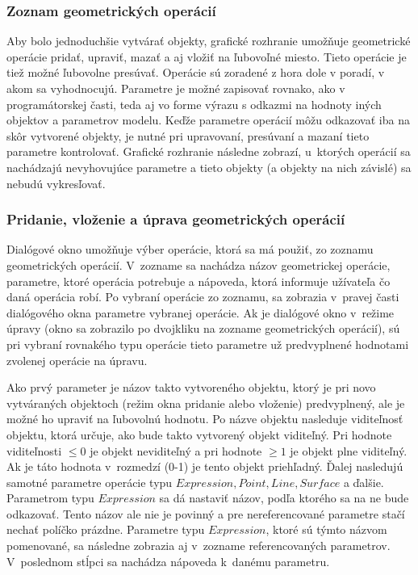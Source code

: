  
\subsubsection*{Zoznam geometrických operácií}
Aby bolo jednoduchšie vytvárať objekty, grafické rozhranie umožňuje geometrické operácie pridať, upraviť, mazať a aj vložiť na ľubovoľné miesto. Tieto operácie je tiež možné ľubovolne presúvať. Operácie sú zoradené z hora dole v poradí, v akom sa vyhodnocujú. Parametre je možné zapisovať rovnako, ako v programátorskej časti, teda aj vo forme výrazu s odkazmi na hodnoty iných objektov a parametrov modelu. Keďže parametre operácií môžu odkazovať iba na skôr vytvorené objekty, je nutné pri upravovaní, presúvaní a mazaní tieto parametre kontrolovať. Grafické rozhranie následne zobrazí, u~ktorých operácií sa nachádzajú nevyhovujúce parametre a tieto objekty (a objekty na nich závislé) sa nebudú vykresľovať.



\subsubsection{Pridanie, vloženie a úprava geometrických operácií} 
Dialógové okno umožňuje výber operácie,  ktorá sa má použiť, zo zoznamu geometrických operácií. V~zozname sa nachádza názov geometrickej operácie, parametre, ktoré operácia potrebuje a nápoveda, ktorá informuje užívateľa čo daná operácia robí.
Po vybraní operácie zo zoznamu, sa zobrazia v~pravej časti dialógového okna parametre vybranej operácie. Ak je dialógové okno v~režime úpravy (okno sa zobrazilo po dvojkliku na zozname geometrických operácií), sú pri vybraní rovnakého typu operácie tieto parametre už predvyplnené hodnotami zvolenej operácie na úpravu.

Ako prvý parameter je názov takto vytvoreného objektu, ktorý je pri novo vytváraných objektoch (režim okna pridanie alebo vloženie) predvyplnený, ale je možné ho upraviť na ľubovolnú hodnotu.  
Po názve objektu nasleduje viditeľnosť objektu, ktorá určuje, ako bude takto vytvorený objekt viditeľný. Pri hodnote viditeľnosti $\leq0$ je objekt neviditeľný a pri hodnote $\geq1$ je objekt plne viditeľný. Ak je táto hodnota v~rozmedzí (0-1) je tento objekt priehľadný. 
Ďalej nasledujú samotné parametre operácie typu $Expression,  Point, Line, Surface$ a ďalšie. Parametrom typu $Expression$ sa dá nastaviť názov, podľa ktorého sa na ne bude odkazovať. Tento názov ale nie je povinný a pre nereferencované parametre stačí nechať políčko prázdne. Parametre typu $Expression$, ktoré sú týmto názvom pomenované, sa následne zobrazia aj v~zozname referencovaných parametrov.
V~poslednom stĺpci sa nachádza nápoveda k~danému parametru.

